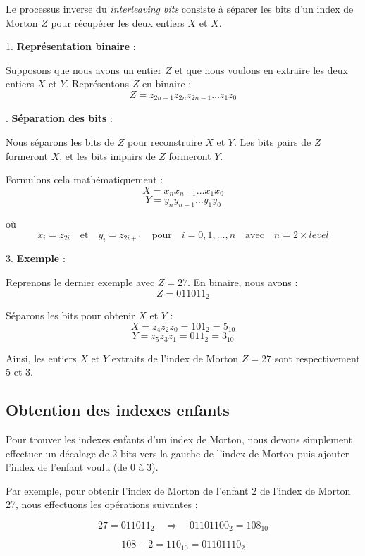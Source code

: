 Le processus inverse du \textit{interleaving bits} consiste à séparer les bits d'un index de Morton \( Z \) pour récupérer les deux entiers \( X \) et \( X \).

1. \textbf{Représentation binaire} :

   Supposons que nous avons un entier \( Z \) et que nous voulons en extraire les deux entiers \( X \) et \( Y \). Représentons \( Z \) en binaire :
   \[
   Z = z_{2n+1} z_{2n} z_{2n-1} \ldots z_1 z_0
   \]

   . \textbf{Séparation des bits} :

   Nous séparons les bits de \( Z \) pour reconstruire \( X \) et \( Y \). Les bits pairs de \( Z \) formeront \( X \), et les bits impairs de \( Z \) formeront \( Y \).

   Formulons cela mathématiquement :
   \[
   X = x_n x_{n-1} \ldots x_1 x_0
   \]
   \[
   Y = y_n y_{n-1} \ldots y_1 y_0
   \]

   où
   \[
   x_i = z_{2i} \quad \text{et} \quad y_i = z_{2i+1} \quad \text{pour} \quad i = 0, 1, \ldots, n \quad \text{avec} \quad n = 2 \times {level}
   \]

3. \textbf{Exemple} :

   Reprenons le dernier exemple avec \( Z = 27 \). En binaire, nous avons :
   \[
   Z = 011011_2
   \]

   Séparons les bits pour obtenir \( X \) et \( Y \) :
   \[
   X = z_{4}z_{2}z_{0} = 101_2 = 5_{10}
   \]
   \[
   Y = z_{5}z_{3}z_{1} = 011_2 = 3_{10}
   \]

Ainsi, les entiers \( X \) et \( Y \) extraits de l'index de Morton \( Z = 27 \) sont respectivement \( 5 \) et \( 3 \).

\subsection*{Obtention des indexes enfants}

Pour trouver les indexes enfants d'un index de Morton, nous devons simplement effectuer un décalage de 2 bits vers la gauche de l'index de Morton puis ajouter l'index de l'enfant voulu (de 0 à 3).

Par exemple, pour obtenir l'index de Morton de l'enfant 2 de l'index de Morton 27, nous effectuons les opérations suivantes :

\[
27 = 011011_2 \quad \Rightarrow \quad 01101100_2 = 108_{10}
\]

\[
108 + 2 = 110_{10} = 01101110_2
\]

